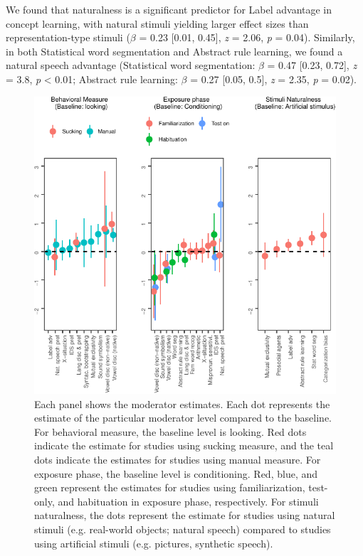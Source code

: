 \documentclass[10pt, letterpaper]{article}
\newenvironment{CodeChunk}{}{}
\begin{document}
We found that naturalness is a significant predictor for Label advantage
in concept learning, with natural stimuli yielding larger effect sizes
than representation-type stimuli (\(\beta\) = 0.23 {[}0.01, 0.45{]},
\emph{z} = 2.06, \emph{p} = 0.04). Similarly, in both Statistical word
segmentation and Abstract rule learning, we found a natural speech
advantage (Statistical word segmentation: \(\beta\) = 0.47 {[}0.23,
0.72{]}, \emph{z} = 3.8, \emph{p} \textless{} 0.01; Abstract rule
learning: \(\beta\) = 0.27 {[}0.05, 0.5{]}, \emph{z} = 2.35, \emph{p} =
0.02).

\begin{CodeChunk}
\begin{figure}[t!]

{\centering \includegraphics{figs/2-col-image-1} 

}

\caption[Each panel shows the moderator estimates]{Each panel shows the moderator estimates. Each dot represents the estimate of the particular moderator level compared to the baseline. For behavioral measure, the baseline level is looking. Red dots indicate the estimate for studies using sucking measure, and the teal dots indicate the estimates for studies using manual measure. For exposure phase, the baseline level is conditioning. Red, blue, and green represent the estimates for studies using familiarization, test-only, and habituation in exposure phase, respectively. For stimuli naturalness, the dots represent the estimate for studies using natural stimuli (e.g. real-world objects; natural speech) compared to studies using artificial stimuli (e.g. pictures, synthetic speech).}\label{fig:2-col-image}
\end{figure}
\end{CodeChunk}
\end{document}
